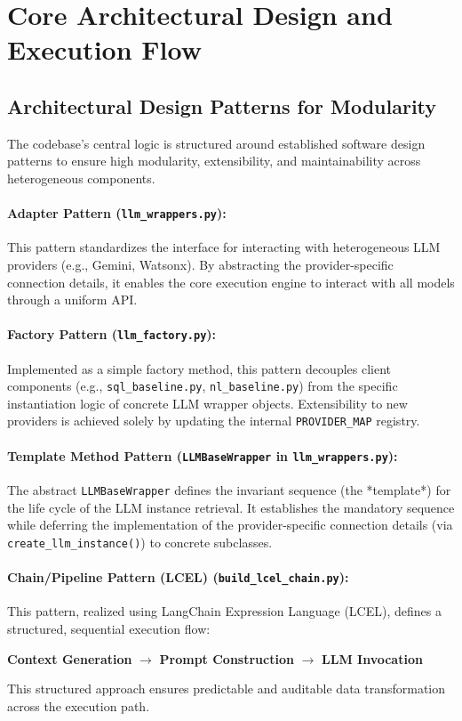 \section{Core Architectural Design and Execution Flow}
\label{sec:Architecture}
\vspace{2em}
\subsection{Architectural Design Patterns for Modularity}
The codebase's central logic is structured around established software design patterns to ensure high modularity, extensibility, and maintainability across heterogeneous components.

\paragraph{\textbf{Adapter Pattern} (\texttt{llm\_wrappers.py}):} This pattern standardizes the interface for interacting with heterogeneous LLM providers (e.g., Gemini, Watsonx). By abstracting the provider-specific connection details, it enables the core execution engine to interact with all models through a uniform API.

\paragraph{\textbf{Factory Pattern} (\texttt{llm\_factory.py}):} Implemented as a simple factory method, this pattern decouples client components (e.g., \texttt{sql\_baseline.py}, \texttt{nl\_baseline.py}) from the specific instantiation logic of concrete LLM wrapper objects. Extensibility to new providers is achieved solely by updating the internal \texttt{PROVIDER\_MAP} registry.

\paragraph{\textbf{Template Method Pattern} (\texttt{LLMBaseWrapper} in \texttt{llm\_wrappers.py}):} The abstract \texttt{LLMBaseWrapper} defines the invariant sequence (the *template*) for the life cycle of the LLM instance retrieval. It establishes the mandatory sequence while deferring the implementation of the provider-specific connection details (via \texttt{create\_llm\_instance()}) to concrete subclasses.

\paragraph{\textbf{Chain/Pipeline Pattern (LCEL)} (\texttt{build\_lcel\_chain.py}):} This pattern, realized using LangChain Expression Language (LCEL), defines a structured, sequential execution flow:
\begin{center}
    \textbf{Context Generation} $\to$ \textbf{Prompt Construction} $\to$ \textbf{LLM Invocation}
\end{center}
This structured approach ensures predictable and auditable data transformation across the execution path.
\newpage

